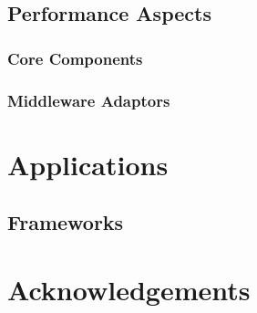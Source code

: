 \documentclass[a4paper,10pt]{article}
\begin{document}
 \subsection{Performance Aspects}

 \subsubsection{Core Components}

 \subsubsection{Middleware Adaptors}

 \section{Applications}

 \subsection{Frameworks}


 \section{Acknowledgements}
 
 
 

  
 
\end{document}
